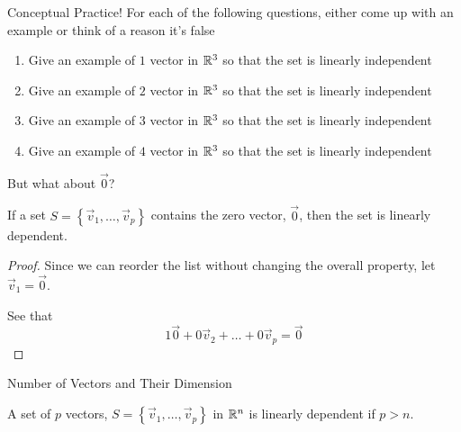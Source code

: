 \documentclass[xcoler=dvipsnames, aspectratio=169]{beamer}
\begin{document}
\begin{frame}{Conceptual Practice!}
    For each of the following questions, either come up with an example or think of a reason it's false
    \begin{enumerate}
        \item Give an example of $1$ vector in $\mathbb{R}^3$ so that the set is linearly independent

        \item Give an example of $2$ vector in $\mathbb{R}^3$ so that the set is linearly independent

        \item Give an example of $3$ vector in $\mathbb{R}^3$ so that the set is linearly independent

        \item Give an example of $4$ vector in $\mathbb{R}^3$ so that the set is linearly independent

    \end{enumerate}
\end{frame}
\begin{frame}{But what about $\vec{0}$?}
    \begin{theorem}
        If a set $S=\left\{\vec{v}_1,\dots,\vec{v}_p\right\}$ contains the zero vector, $\vec{0}$,
        then the set is linearly dependent.
    \end{theorem}
    \vspace{60pt}
    \begin{proof}
        Since we can reorder the list without changing the overall property, let $\vec{v}_1=\vec{0}$.\pause

        See that
        \[
            1\vec{0} + 0\vec{v}_2 + \dots + 0\vec{v}_p = \vec{0}
        \]
    \end{proof}
\end{frame}
\begin{frame}{Number of Vectors and Their Dimension}
    \begin{theorem}
        A set of $p$ vectors, $S=\left\{\vec{v}_1,\dots,\vec{v}_p\right\}$ in $\mathbb{R}^n$ is linearly
        dependent if $p>n$.
    \end{theorem}
    \vspace{200pt}
\end{frame}
\end{document}
